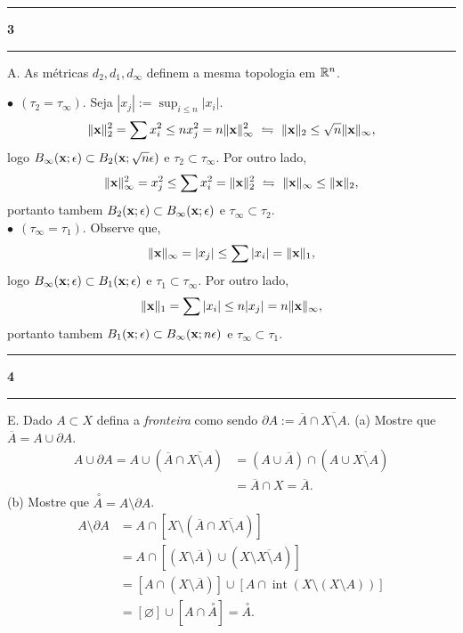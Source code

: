 \newcommand{\F}{\mathbb{F}}
\newcommand{\C}{\mathbb{C}}
\newcommand{\an}{\mathscr{A}} 
\newcommand{\Q}{\mathbb{Q}}
\renewcommand{\hom}{\operatorname{Hom}}
\newcommand{\ehom}{\operatorname{End}}

\-\vspace{-0.3cm}
  {\hrule \vspace{-0.15cm}
  \centering \textbf{3} \vspace{0.1cm}
  \hrule}

A. As métricas \( d_2, d_1, d_\infty\) definem a mesma topologia em \(\mathbb{R}^n\).   

\textcolor{gris}{\(\bullet \ \ (\tau_2 = \tau_\infty)\). Seja \(|x_j| := \sup_{i\leq n} |x_i|\). 
\[\|\textbf{x}\|_2^2 = \sum x_i^2 \leq n x_j^2 = n \|\textbf{x}\|_\infty^2\ \leftrightharpoons \ \|\textbf{x}\|_2 \leq \sqrt{n}\|\textbf{x}\|_\infty, \]
logo \(B_\infty(\textbf{x}; \epsilon)\subset B_2(\textbf{x}; \sqrt{n}\epsilon)\) e \(\tau_2 \subset \tau_\infty\). Por outro lado, 
\[\|\textbf{x}\|_\infty^2 = x_j^2 \leq \sum x_i^2 = \|\textbf{x}\|_2^2 \ \leftrightharpoons \ \|\textbf{x}\|_\infty \leq \|\textbf{x}\|_2,  \]
portanto tambem \(B_2(\textbf{x}; \epsilon ) \subset B_\infty(\textbf{x}; \epsilon )\) e \(\tau_\infty \subset \tau_2\). \\ 
\(\bullet \ \ (\tau_\infty = \tau_1)\). Observe que, 
\[\|\textbf{x}\|_\infty = |x_j| \leq \sum |x_i| = \|\textbf{x}\|_1, \] 
logo \(B_\infty(\textbf{x};\epsilon) \subset B_1(\textbf{x};\epsilon)\) e \(\tau_1 \subset \tau_\infty\). Por outro lado, 
\[\|\textbf{x}\|_1 = \sum |x_i| \leq n |x_j| = n \|\textbf{x}\|_\infty, \]
portanto tambem \(B_1(\textbf{x};\epsilon) \subset B_\infty(\textbf{x};n\epsilon)\) e \(\tau_\infty \subset \tau_1\). 
}

\-\vspace{-0.3cm}
  {\hrule \vspace{-0.15cm}
  \centering \textbf{4} \vspace{0.1cm}
  \hrule}

E. Dado \(A\subset X\) defina a \emph{fronteira} como sendo \(\partial A := \overline{A} \cap \overline{X\setminus A }\). (a) Mostre que \(\overline{A} = A \cup \partial A\). 
\textcolor{gris}{
  \begin{align*}
  A \cup \partial A = A \cup (\overline{A} \cap \overline{X\setminus A }) &= (A \cup \overline{A}) \cap  (A \cup \overline{X \setminus A}) \\ 
  &= \overline{A} \cap X = \overline{A}.
  \end{align*}
}
  (b) Mostre que \(\overset{\  \circ}{A} = A \setminus \partial A\).  
\textcolor{gris}{\begin{align*}
A\setminus \partial A &= A \cap [X \setminus (\overline{A} \cap \overline{X\setminus A})]\\ 
&=A \cap [(X \setminus \overline{A}) \cup (X\setminus \overline{X\setminus A})] \\ 
&=[A \cap (X \setminus \overline{A})] \cup [A \cap \operatorname{int}(X\setminus (X\setminus A))] \\ 
&=[\varnothing] \cup [A \cap \overset{\ \circ }{A}]  = \overset{\ \circ}{A} . 
\end{align*}}

